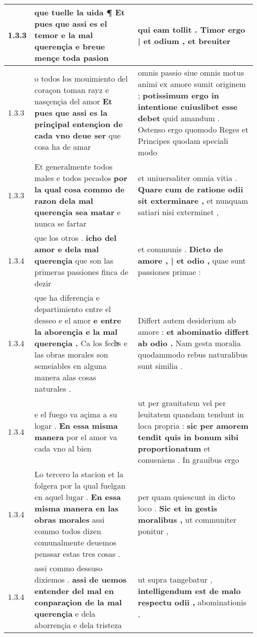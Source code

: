\begin{tabular}{|p{1cm}|p{6.5cm}|p{6.5cm}|}
1.3.3 & que tuelle la uida ¶ \textbf{ Et pues que assi es el temor e la mal querençia } e breue mençe toda pasion & qui eam tollit . \textbf{ Timor ergo | et odium , } et breuiter \\\hline
1.3.3 & o todos los mouimiento del coraçon toman rayz e nasçençia del amor \textbf{ Et pues que assi es la prinçipal entençion de cada vno deue ser } que cosa ha de amar & omnis passio siue omnis motus animi ex amore sumit originem ; \textbf{ potissimum ergo in intentione cuiuslibet esse debet } quid amandum . Ostenso ergo quomodo Reges et Principes quodam speciali modo \\\hline
1.3.3 & Et generalmente todos males e todos pecados \textbf{ por la qual cosa commo de razon dela mal querençia sea matar } e nunca se fartar & et uniuersaliter omnia vitia . \textbf{ Quare cum de ratione odii sit exterminare , } et nunquam satiari nisi exterminet , \\\hline
1.3.4 & que los otros . \textbf{ icho del amor e dela mal querençia } que son las primeras passiones finca de dezir & et communis . \textbf{ Dicto de amore , | et odio , } quae sunt passiones primae : \\\hline
1.3.4 & que ha diferençia e departimiento entre el desseo e el amor \textbf{ e entre la aborençia e la mal querençia . } Ca los fechͣs e las obras morales son semeiables en alguna manera alas cosas naturales . & Differt autem desiderium ab amore : \textbf{ et abominatio differt ab odio . } Nam gesta moralia quodammodo rebus naturalibus sunt similia . \\\hline
1.3.4 & e el fuego va açima a su logar . \textbf{ En essa misma manera } por el amor va cada vno al bien & ut per grauitatem vel per leuitatem quandam tendunt in loca propria : \textbf{ sic per amorem tendit quis in bonum sibi proportionatum } et conueniens . In grauibus ergo \\\hline
1.3.4 & Lo tercero la stacion et la folgera por la qual fuelgan en aquel lugar . \textbf{ En essa misma manera en las obras morales } assi commo todos dizen comunalmente deuemos penssar estas tres cosas . & per quam quiescunt in dicto loco . \textbf{ Sic et in gestis moralibus , } ut communiter ponitur , \\\hline
1.3.4 & assi commo dessuso dixiemos . \textbf{ assi de uemos entender del mal en conparaçion de la mal querençia } e dela aborrençia e dela tristeza & ut supra tangebatur , \textbf{ intelligendum est de malo respectu odii , } abominationis , \\\hline

\end{tabular}
